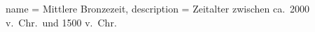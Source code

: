 
{
    name = Mittlere Bronzezeit,
    description = {Zeitalter zwischen ca.\ 2000 v.\ Chr.\ und 1500 v.\ Chr.}
}


